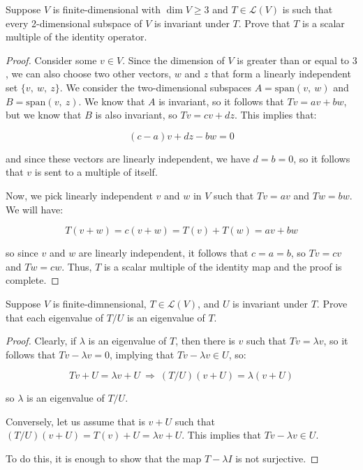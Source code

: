 \documentclass[10pt, oneside]{article}
\newenvironment{problem}[2][Problem]{\begin{trivlist}
\item[\hskip \labelsep {\bfseries #1}\hskip \labelsep {\bfseries #2.}]}{\end{trivlist}}
\begin{document}
    \begin{problem}{5.28}
      Suppose $V$ is finite-dimensional with $\dim V \geq 3$ and $T \in \mathcal{L}(V)$ is such that every 2-dimensional subspace of $V$ is
      invariant under $T$. Prove that $T$ is a scalar multiple of the identity operator.
    \end{problem}

    \begin{proof}

      Consider some $v \in V$. Since the dimension of $V$ is greater than or equal to $3$, we can also choose
      two other vectors, $w$ and $z$ that form a linearly independent set $\{v, \ w, \ z\}$.
      We consider the two-dimensional subspaces $A = \text{span}(v, \ w)$ and $B = \text{span}(v, \ z)$. We know that
      $A$ is invariant, so it follows that $Tv = av + bw$, but we know that $B$ is also invariant, so $Tv = cv + dz$. This implies that:

      $$(c - a)v + dz - bw = 0$$

      and since these vectors are linearly independent, we have $d = b = 0$, so it follows that $v$ is sent to a multiple of itself.
      \newline

      Now, we pick linearly independent $v$ and $w$ in $V$ such that $T v = a v$ and $T w = b w$. We will have:

      $$T(v + w) = c(v + w) = T(v) + T(w) = av + bw$$

      so since $v$ and $w$ are linearly independent, it follows that $c = a = b$, so $Tv = cv$ and $Tw = cw$. Thus, $T$ is a scalar multiple of the
      identity map and the proof is complete.

    \end{proof}

    \begin{problem}{5.35}
      Suppose $V$ is finite-dimnensional, $T \in \mathcal{L}(V)$, and $U$ is invariant under $T$. Prove that each eigenvalue of $T/U$ is an eigenvalue of $T$.
    \end{problem}

    \begin{proof}
      Clearly, if $\lambda$ is an eigenvalue of $T$, then there is $v$ such that $Tv = \lambda v$, so it follows that $Tv - \lambda v = 0$, implying that
      $Tv - \lambda v \in U$, so:

      $$Tv + U = \lambda v + U \ \Rightarrow \ (T/U)(v + U) = \lambda (v + U)$$

      so $\lambda$ is an eigenvalue of $T/U$.
      \newline

      Conversely, let us assume that is $v + U$ such that $(T/U)(v + U) = T(v) + U = \lambda v + U$. This
      implies that $Tv - \lambda v \in U$.
      \newline

      To do this, it is enough to show that the map $T - \lambda I$ is not surjective. 

    \end{proof}
\end{document}
